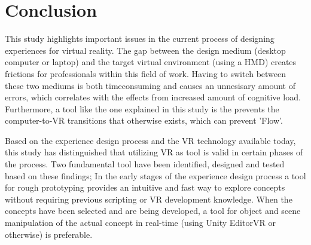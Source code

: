 \chapter{Conclusion}
This study highlights important issues in the current process of designing experiences for virtual reality. The gap between the design medium (desktop computer or laptop) and the target virtual environment (using a HMD) creates frictions for professionals within this field of work. Having to switch between these two mediums is both timeconsuming and causes an unnesisary amount of errors, which correlates with the effects from increased amount of cognitive load. Furthermore, a tool like the one explained in this study is the prevents the computer-to-VR transitions that otherwise exists, which can prevent 'Flow'.

Based on the experience design process and the VR technology available today, this study has distinguished that utilizing VR as tool is valid in certain phases of the process. Two fundamental tool have been identified, designed and tested based on these findings; In the early stages of the experience design process a tool for rough prototyping provides an intuitive and fast way to explore concepts without requiring previous scripting or VR development knowledge. When the concepts have been selected and are being developed, a tool for object and scene manipulation of the actual concept in real-time (using Unity EditorVR or otherwise) is preferable.
